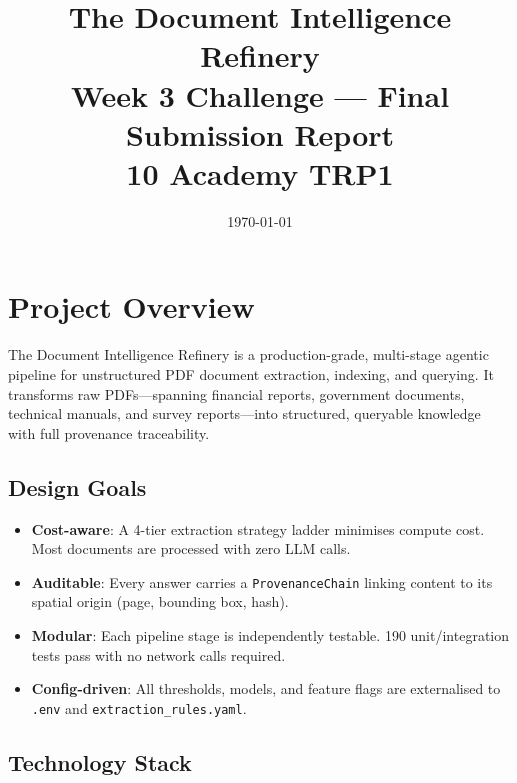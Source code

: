 \documentclass[12pt,a4paper]{article}
\title{
    \vspace{-1cm}
    \textbf{The Document Intelligence Refinery} \\[0.3cm]
    \large Week 3 Challenge — Final Submission Report \\[0.2cm]
    \normalsize 10 Academy TRP1
}
\author{}
\date{\today}
\begin{document}
\maketitle
\thispagestyle{fancy}

\tableofcontents
\newpage

\section{Project Overview}

The Document Intelligence Refinery is a production-grade, multi-stage agentic
pipeline for unstructured PDF document extraction, indexing, and querying.
It transforms raw PDFs—spanning financial reports, government documents,
technical manuals, and survey reports—into structured, queryable knowledge
with full provenance traceability.

\subsection{Design Goals}

\begin{itemize}[nosep]
    \item \textbf{Cost-aware}: A 4-tier extraction strategy ladder minimises
          compute cost.  Most documents are processed with zero LLM calls.
    \item \textbf{Auditable}: Every answer carries a \texttt{ProvenanceChain}
          linking content to its spatial origin (page, bounding box, hash).
    \item \textbf{Modular}: Each pipeline stage is independently testable.
          190 unit/integration tests pass with no network calls required.
    \item \textbf{Config-driven}: All thresholds, models, and feature flags
          are externalised to \texttt{.env} and \texttt{extraction\_rules.yaml}.
\end{itemize}

\subsection{Technology Stack}
\end{document}
